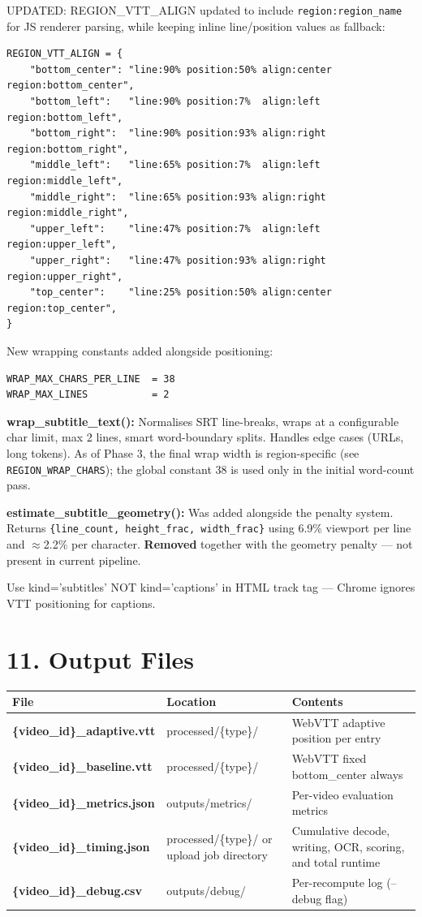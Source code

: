 \documentclass[11pt]{article}
\begin{document}
UPDATED: REGION\_VTT\_ALIGN updated to include \texttt{region:region\_name} for JS renderer parsing, while keeping inline line/position values as fallback:

\begin{verbatim}
REGION_VTT_ALIGN = {
    "bottom_center": "line:90% position:50% align:center region:bottom_center",
    "bottom_left":   "line:90% position:7%  align:left   region:bottom_left",
    "bottom_right":  "line:90% position:93% align:right  region:bottom_right",
    "middle_left":   "line:65% position:7%  align:left   region:middle_left",
    "middle_right":  "line:65% position:93% align:right  region:middle_right",
    "upper_left":    "line:47% position:7%  align:left   region:upper_left",
    "upper_right":   "line:47% position:93% align:right  region:upper_right",
    "top_center":    "line:25% position:50% align:center region:top_center",
}
\end{verbatim}

New wrapping constants added alongside positioning:

\begin{verbatim}
WRAP_MAX_CHARS_PER_LINE  = 38
WRAP_MAX_LINES           = 2
\end{verbatim}

\textbf{wrap\_subtitle\_text():} Normalises SRT line-breaks, wraps at a configurable char limit, max 2 lines, smart word-boundary splits. Handles edge cases (URLs, long tokens). As of Phase 3, the final wrap width is region-specific (see \texttt{REGION\_WRAP\_CHARS}); the global constant 38 is used only in the initial word-count pass.

\textbf{estimate\_subtitle\_geometry():} Was added alongside the penalty system. Returns \texttt{\{line\_count, height\_frac, width\_frac\}} using 6.9\% viewport per line and $\approx$2.2\% per character. \textbf{Removed} together with the geometry penalty --- not present in current pipeline.

Use kind='subtitles' NOT kind='captions' in HTML track tag --- Chrome ignores VTT positioning for captions.

\section*{11. Output Files}
\begin{tabularx}{\textwidth}{>{\bfseries}l l X}
File & Location & Contents \\
\midrule
\{video\_id\}\_adaptive.vtt & processed/\{type\}/ & WebVTT adaptive position per entry \\
\{video\_id\}\_baseline.vtt & processed/\{type\}/ & WebVTT fixed bottom\_center always \\
\{video\_id\}\_metrics.json & outputs/metrics/ & Per-video evaluation metrics \\
\{video\_id\}\_timing.json & processed/\{type\}/ or upload job directory & Cumulative decode, writing, OCR, scoring, and total runtime \\
\{video\_id\}\_debug.csv & outputs/debug/ & Per-recompute log (--debug flag) \\
\end{tabularx}
\end{document}
